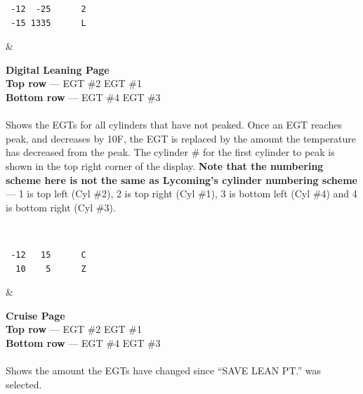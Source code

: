 \begin{longtable}
\begin{minipage}{\eistableleftcol}\ttfamily
  \begin{verbatim} -12  -25      2
 -15 1335      L
\end{verbatim}
\end{minipage}&
\begin{minipage}{\eistablerightcol}
\vspace{\tabletopspace}
\textbf{Digital Leaning Page }\\
\textbf{Top row} --- EGT \#2 EGT \#1\\
\textbf{Bottom row} ---  EGT \#4 EGT \#3\\\\
Shows the EGTs for all cylinders that have not peaked.  
Once an EGT reaches peak, and decreases by 10\textdegree F, the EGT is replaced by the amount the temperature has
decreased from the peak.  
The cylinder \# for the first cylinder to peak is shown in the top right corner of the display.  \textbf{Note that the
numbering scheme here is not the same as Lycoming's cylinder numbering scheme} --- 1 is top left (Cyl \#2), 2 is top right (Cyl \#1), 3 is bottom left (Cyl \#4) and 4 is bottom right (Cyl \#3). 
\vspace{\tablebottomspace}
\end{minipage}\\
\hline

\begin{minipage}{\eistableleftcol}\ttfamily
\begin{verbatim} -12   15      C
  10    5      Z\end{verbatim}
\end{minipage}&
\begin{minipage}{\eistablerightcol}
\vspace{\tabletopspace}
\vspace{.25ex}
\textbf{Cruise Page }\\
\textbf{Top row} --- EGT \#2 EGT \#1\\
\textbf{Bottom row} ---  EGT \#4 EGT \#3\\\\
Shows the amount the EGTs have changed since ``SAVE LEAN PT.'' was selected.
\vspace{.25ex}
\vspace{\tablebottomspace}
\end{minipage}\\
\hline


\end{longtable}
